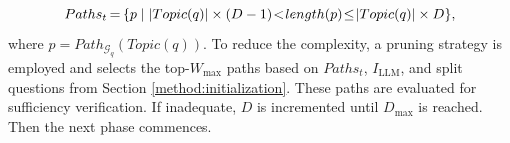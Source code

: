 \[
Paths_{t}\hspace{-1pt}=\hspace{-1pt}\{p \mid |Topic(q)|\times (D-1) \hspace{-2pt}< \hspace{-2pt }length(p)\hspace{-2pt} \leq \hspace{-2pt}|Topic(q)| \times D\},
\]
where $p = Path_{\mathcal{G}_q}(Topic(q))$. To reduce the complexity, a pruning strategy is employed and selects the top-$W_{\max}$ paths based on $Paths_{t}$, $I_{\text{LLM}}$, and split questions from Section \ref{method:initialization}. These paths are evaluated for sufficiency verification. If inadequate, $D$ is incremented until $D_{\max}$ is reached. Then the next phase commences.




